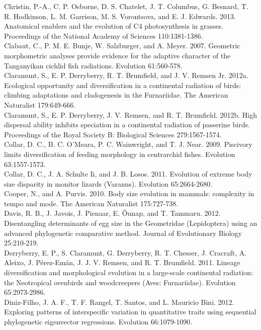 \documentclass[a4paper,12pt]{article}
\begin{document}
Christin, P.-A., C. P. Osborne, D. S. Chatelet, J. T. Columbus, G. Besnard, T. R. Hodkinson, L. M. Garrison, M. S. Vorontsova, and E. J. Edwards. 2013. Anatomical enablers and the evolution of C4 photosynthesis in grasses. Proceedings of the National Academy of Sciences 110:1381-1386.\\
Clabaut, C., P. M. E. Bunje, W. Salzburger, and A. Meyer. 2007. Geometric morphometric analyses provide evidence for the adaptive character of the Tanganyikan cichlid fish radiations. Evolution 61:560-578.\\
Claramunt, S., E. P. Derryberry, R. T. Brumfield, and J. V. Remsen Jr. 2012a. Ecological opportunity and diversification in a continental radiation of birds: climbing adaptations and cladogenesis in the Furnariidae. The American Naturalist 179:649-666.\\
Claramunt, S., E. P. Derryberry, J. V. Remsen, and R. T. Brumfield. 2012b. High dispersal ability inhibits speciation in a continental radiation of passerine birds. Proceedings of the Royal Society B: Biological Sciences 279:1567-1574.\\
Collar, D. C., B. C. O'Meara, P. C. Wainwright, and T. J. Near. 2009. Piscivory limits diversification of feeding morphology in centrarchid fishes. Evolution 63:1557-1573.\\
Collar, D. C., J. A. Schulte Ii, and J. B. Losos. 2011. Evolution of extreme body size disparity in monitor lizards (Varanus). Evolution 65:2664-2680.\\
Cooper, N., and A. Purvis. 2010. Body size evolution in mammals: complexity in tempo and mode. The American Naturalist 175:727-738.\\
Davis, R. B., J. Javois, J. Pienaar, E. Õunap, and T. Tammaru. 2012. Disentangling determinants of egg size in the Geometridae (Lepidoptera) using an advanced phylogenetic comparative method. Journal of Evolutionary Biology 25:210-219.\\
Derryberry, E. P., S. Claramunt, G. Derryberry, R. T. Chesser, J. Cracraft, A. Aleixo, J. Pérez-Emán, J. J. V. Remsen, and R. T. Brumfield. 2011. Lineage diversification and morphological evolution in a large-scale continental radiation: the Neotropical ovenbirds and woodcreepers (Aves: Furnariidae). Evolution 65:2973-2986.\\
Diniz-Filho, J. A. F., T. F. Rangel, T. Santos, and L. Mauricio Bini. 2012. Exploring patterns of interspecific variation in quantitative traits using sequential phylogenetic eigenvector regressions. Evolution 66:1079-1090.\\
\end{document}
